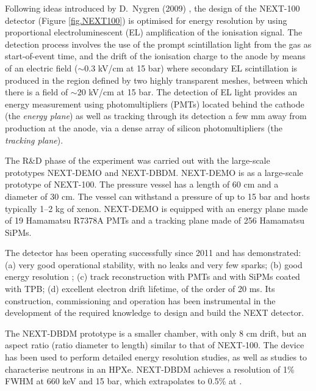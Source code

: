 \documentclass{PoS}
\begin{document}
Following ideas introduced by D.\ Nygren (2009) \cite{Nygren:2009zz}, the design of the NEXT-100 detector (Figure \ref{fig.NEXT100}) is optimised for energy resolution by using proportional electroluminescent (EL) amplification of the ionisation signal. The detection process involves the use of the prompt scintillation light from the gas as start-of-event time, and the drift of the ionisation charge to the anode by means of an electric field ($\sim0.3$ kV/cm at 15 bar) where secondary EL scintillation is produced in the region defined by two highly transparent meshes, between which there is a field of $\sim20$ kV/cm at 15 bar. The detection of EL light provides an energy measurement using photomultipliers (PMTs) located behind the cathode (the \emph{energy plane}) as well as tracking through its detection a few mm away from production at the anode, via a dense array of silicon photomultipliers (the \emph{tracking plane}).

The R\&D phase of the experiment was carried out with the large-scale prototypes NEXT-DEMO and NEXT-DBDM. NEXT-DEMO is as a large-scale prototype of NEXT-100. The pressure vessel has a length of 60 cm and a diameter of 30 cm. The vessel can withstand a pressure of up to 15 bar and hosts typically 1--2 kg of xenon. NEXT-DEMO is  equipped with an energy plane made of 19 Hamamatsu R7378A PMTs and a tracking plane made of 256 Hamamatsu SiPMs. 

The detector has been operating successfully since 2011 and has demonstrated: (a) very good operational stability, with no leaks and very few sparks; (b) good energy resolution ; (c) track reconstruction with PMTs and with SiPMs coated with TPB; (d) excellent electron drift lifetime, of the order of 20 ms. Its construction, commissioning and operation has been instrumental in the development of the required knowledge to design and build the NEXT detector.

The NEXT-DBDM prototype is a smaller chamber, with only 8 cm drift, but an aspect ratio (ratio diameter to length) similar to that of NEXT-100. The device has been used to perform detailed energy resolution studies, as well as studies to characterise neutrons in an HPXe. NEXT-DBDM achieves a resolution of 1\% FWHM at 660 keV and 15 bar, which extrapolates to 0.5\% at \Qbb.
\end{document}

